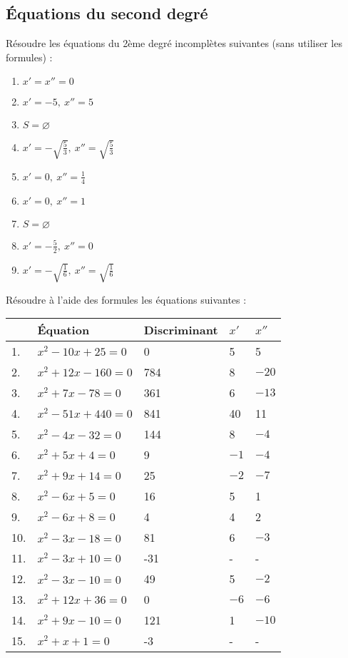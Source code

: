 \subsection{\'Equations du second degré}

\begin{solution}
Résoudre les équations du 2ème degré incomplètes suivantes (sans utiliser les formules) :
\begin{multicols}{2}
\begin{enumerate}
\item ${x}'={x}''=0$
\item ${x}'=-5,\ {x}''=5$
\item $S=\varnothing $
\item ${x}'=-\sqrt{\frac{5}{3}},\ {x}''=\sqrt{\frac{5}{3}}$
\item ${x}'=0,\ {x}''=\frac{1}{4}$
\item ${x}'=0,\ {x}''=1$
\item $S=\varnothing $
\item ${x}'=-\frac{5}{2},\ {x}''=0$
\item ${x}'=-\sqrt{\frac{1}{6}},\ {x}''=\sqrt{\frac{1}{6}}$
\end{enumerate}
\end{multicols}
\end{solution}

\begin{solution}
Résoudre à l'aide des formules les équations suivantes :

\begin{tabular}{|l|l|l|l|l|}
\hline
	& Équation	& Discriminant &	${x}'$	& ${x}''$\\
	\hline
1.&	${{x}^{2}}-10x+25=0$	&0&	5&	5\\
\hline
2.&	${{x}^{2}}+12x-160=0$	&784&	8&	$-20$\\
\hline
3.&	${{x}^{2}}+7x-78=0$	&361&	6&	$-13$\\
\hline
4.&	${{x}^{2}}-51x+440=0$	&841&	40&	11\\
\hline
5.&	${{x}^{2}}-4x-32=0$	&144&	8&	$-4$\\
\hline
6.&	${{x}^{2}}+5x+4=0$	&9&	$-1$&	$-4$\\
\hline
7.&	${{x}^{2}}+9x+14=0$	&25&	$-2$&	$-7$\\
\hline
8.&	${{x}^{2}}-6x+5=0$	&16&	5&	1\\
\hline
9.&	${{x}^{2}}-6x+8=0$	&4&	4&	2\\
\hline
10.&	${{x}^{2}}-3x-18=0$	&81&	6&	$-3$\\
\hline
11.&	${{x}^{2}}-3x+10=0$	&-31&	-&	-\\
\hline
12.&	${{x}^{2}}-3x-10=0$	&49&	5&	$-2$\\
\hline
13.&	${{x}^{2}}+12x+36=0$	&0&	$-6$&	$-6$\\
\hline
14.&	${{x}^{2}}+9x-10=0$	&121&	1&	$-10$\\
\hline
15.&	${{x}^{2}}+x+1=0$	&-3&	-&	-\\
\hline
\end{tabular}
\end{solution}

